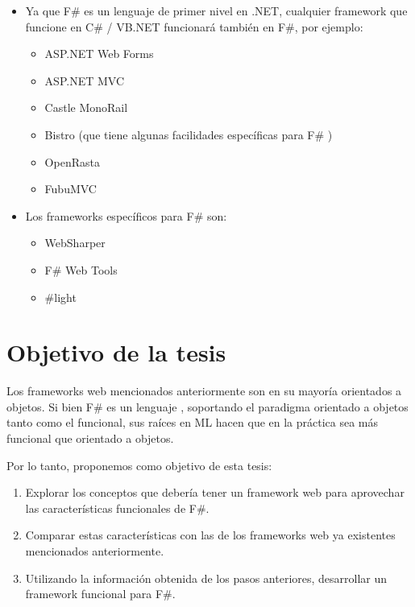 \documentclass[12pt]{article}
\begin{document}
\begin{itemize}
	\item Ya que F\# es un lenguaje de primer nivel en .NET, cualquier framework que funcione en C\# / VB.NET funcionará también en F\#, por ejemplo:
	\begin{itemize}
		\item ASP.NET Web Forms \cite{webforms}
		\item ASP.NET MVC \cite{mvc}
		\item Castle MonoRail \cite{monorail}
		\item Bistro \cite{bistro} (que tiene algunas facilidades específicas para F\# \cite{bistroext})
		\item OpenRasta \cite{openrasta}
		\item FubuMVC \cite{fubumvc}
	\end{itemize}
	\item Los frameworks específicos para F\# son:
	\begin{itemize}
		\item WebSharper \cite{websharper}
		\item F\# Web Tools \cite{fswebtools}
		\item \#light \cite{sharplight}
	\end{itemize}
\end{itemize}

\section{Objetivo de la tesis}

Los frameworks web mencionados anteriormente son en su mayoría orientados a objetos. Si bien F\# es un lenguaje , soportando el paradigma orientado a objetos tanto como el funcional, sus raíces en ML hacen que en la práctica sea más funcional que orientado a objetos.

Por lo tanto, proponemos como objetivo de esta tesis:
\begin{enumerate}
	\item Explorar los conceptos que debería tener un framework web para aprovechar las características funcionales de F\#.
	\item Comparar estas características con las de los frameworks web ya existentes mencionados anteriormente.
	\item Utilizando la información obtenida de los pasos anteriores, desarrollar un framework funcional para F\#. 
\end{enumerate}
\end{document}
